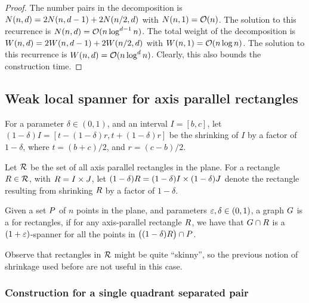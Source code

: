 \documentclass[12pt]{article}%
\begin{document}
\begin{proof}
    The number pairs in the decomposition is
    \begin{math}
        N(n,d) = 2N(n,d-1) + 2N\pth{ n/2, d }
    \end{math}
    with $N(n,1) = \mathcal{O}(n)$. The solution to this recurrence is
    $N(n,d) = \mathcal{O}( n \log^{d-1} n)$.  The total weight of the
    decomposition is
    \begin{math}
        W(n,d) = 2W(n,d-1) + 2W\pth{ n/2, d }
    \end{math}
    with $W(n,1) = \mathcal{O}(n \log n)$. The solution to this recurrence is
    $W(n,d) = \mathcal{O}( n \log^{d} n)$. Clearly, this also bounds the
    construction time.
\end{proof}


\subsection{Weak local spanner for axis parallel rectangles}

For a parameter $\delta \in (0,1)$, and an interval $I = [b,c]$, let
$(1-\delta)I = [t - (1-\delta)r, t+ (1-\delta)r]$ be the shrinking of
$I$ by a factor of $1-\delta$, where $t = (b+c)/2$, and $r = (c-b)/2$.


Let $\mathcal{R}$ be the set of all axis parallel rectangles in the
plane. For a rectangle $R \in \mathcal{R}$, with $R = I \times J$,
let $(1-\delta)R = (1-\delta)I \times (1-\delta)J$ denote the
rectangle resulting from shrinking $R$ by a factor of $1-\delta$.

\begin{defn}
    Given a set $P$ of $n$ points in the plane, and parameters
    $\varepsilon, \delta \in (0,1)$, a graph $G$ is a
     for rectangles, if
    for any axis-parallel rectangle $R$, we have that
    $G \cap {R}$ is a $(1+\varepsilon)$-spanner for all the points
    in $\bigl((1-\delta)R\bigr) \cap P$.
\end{defn}

Observe that rectangles in $\mathcal{R}$ might be quite ``skinny'', so the
previous notion of shrinkage used before are not useful in this case.

\subsubsection{Construction for a single quadrant separated pair}
\end{document}
